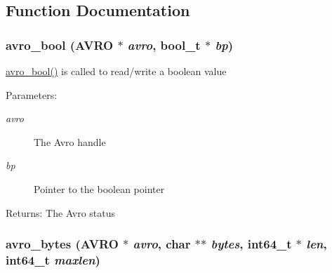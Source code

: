 \subsection{Function Documentation}
\hypertarget{group___primitives_ga230ba9c2028579916da8e3ef7abbb07}{
\subsubsection[{avro\_\-bool}]{ avro\_\-bool ({\bf AVRO} $\ast$ {\em avro}, \/  bool\_\-t $\ast$ {\em bp})}}
\label{group___primitives_ga230ba9c2028579916da8e3ef7abbb07}


\hyperlink{group___primitives_ga230ba9c2028579916da8e3ef7abbb07}{avro\_\-bool()} is called to read/write a boolean value \begin{Desc}
\item[Parameters:]
\begin{description}
\item[{\em avro}]The Avro handle \item[{\em bp}]Pointer to the boolean pointer \end{description}
\end{Desc}
\begin{Desc}
\item[Returns:]The Avro status \end{Desc}
\hypertarget{group___primitives_g883aa71b77043b51296ab278c2a84a23}{
\subsubsection[{avro\_\-bytes}]{ avro\_\-bytes ({\bf AVRO} $\ast$ {\em avro}, \/  char $\ast$$\ast$ {\em bytes}, \/  int64\_\-t $\ast$ {\em len}, \/  int64\_\-t {\em maxlen})}}
\label{group___primitives_g883aa71b77043b51296ab278c2a84a23}


